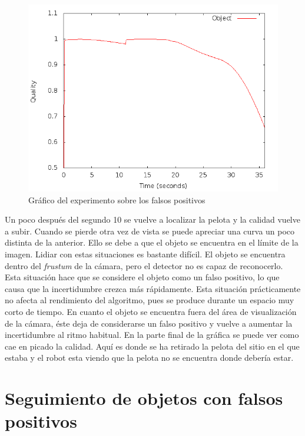 \begin{figure} [h]
  \begin{center}
    \includegraphics[width=13cm]{img/cap5/exp1.png}
  \end{center}
  \caption{Gráfico del experimento sobre los falsos positivos}
  \label{fig:exp1}
\end{figure}

Un poco después del segundo 10 se vuelve a localizar la pelota y la calidad vuelve a subir. Cuando se pierde otra vez de vista se puede apreciar una curva un poco distinta de la anterior. Ello se debe a que el objeto se encuentra en el límite de la imagen. Lidiar con estas situaciones es bastante difícil. El objeto se encuentra dentro del \textit{frustum} de la cámara, pero el detector no es capaz de reconocerlo. Esta situación hace que se considere el objeto como un falso positivo, lo que causa que la incertidumbre crezca más rápidamente. Esta situación prácticamente no afecta al rendimiento del algoritmo, pues se produce durante un espacio muy corto de tiempo. En cuanto el objeto se encuentra fuera del área de visualización de la cámara, éste deja de considerarse un falso positivo y vuelve a aumentar la incertidumbre al ritmo habitual. En la parte final de la gráfica se puede ver como cae en picado la calidad. Aquí es donde se ha retirado la pelota del sitio en el que estaba y el robot esta viendo que la pelota no se encuentra donde debería estar.\\

\section{Seguimiento de objetos con falsos positivos}
\label{sec:seguimientofalsospositivos}

